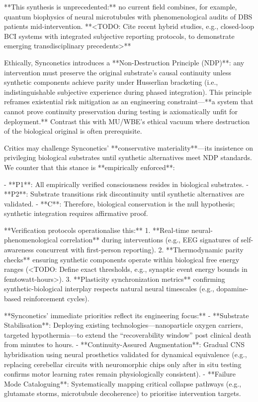 \documentclass[10pt]{article}
\begin{document}
\begin{sloppypar}
  **This synthesis is unprecedented:** no current field combines, for example, quantum biophysics of neural microtubules with phenomenological audits of DBS patients mid-intervention. **<TODO: Cite recent hybrid studies, e.g., closed-loop BCI systems with integrated subjective reporting protocols, to demonstrate emerging transdisciplinary precedents>**

  Ethically, Synconetics introduces a **Non-Destruction Principle (NDP)**: any intervention must preserve the original substrate’s causal continuity unless synthetic components achieve parity under Husserlian bracketing (i.e., indistinguishable subjective experience during phased integration). This principle reframes existential risk mitigation as an engineering constraint—**a system that cannot prove continuity preservation during testing is axiomatically unfit for deployment.** Contrast this with MU/WBE’s ethical vacuum where destruction of the biological original is often prerequisite.

  Critics may challenge Synconetics’ **conservative materiality**—its insistence on privileging biological substrates until synthetic alternatives meet NDP standards. We counter that this stance is **empirically enforced**:

  - **P1**: All empirically verified consciousness resides in biological substrates.
  - **P2**: Substrate transitions risk discontinuity until synthetic alternatives are validated.
  - **C**: Therefore, biological conservation is the null hypothesis; synthetic integration requires affirmative proof.

  **Verification protocols operationalise this:**
  1. **Real-time neural-phenomenological correlation** during interventions (e.g., EEG signatures of self-awareness concurrent with first-person reporting).
  2. **Thermodynamic parity checks** ensuring synthetic components operate within biological free energy ranges (<TODO: Define exact thresholds, e.g., synaptic event energy bounds in femtowatt-hours>).
  3. **Plasticity synchronization metrics** confirming synthetic-biological interplay respects natural neural timescales (e.g., dopamine-based reinforcement cycles).

  **Synconetics’ immediate priorities reflect its engineering focus:**
  - **Substrate Stabilisation**: Deploying existing technologies—nanoparticle oxygen carriers, targeted hypothermia—to extend the “recoverability window” post clinical death from minutes to hours.
  - **Continuity-Assured Augmentation**: Gradual CNS hybridisation using neural prosthetics validated for dynamical equivalence (e.g., replacing cerebellar circuits with neuromorphic chips only after in situ testing confirms motor learning rates remain physiologically consistent).
  - **Failure Mode Cataloguing**: Systematically mapping critical collapse pathways (e.g., glutamate storms, microtubule decoherence) to prioritise intervention targets.


\end{sloppypar}
\end{document}
